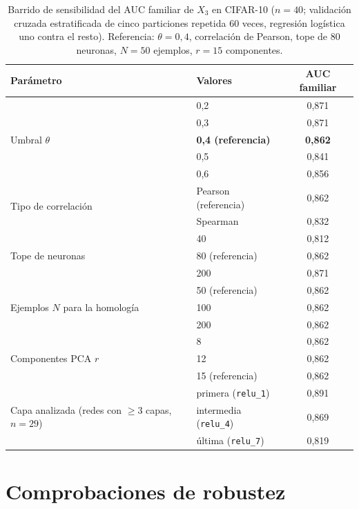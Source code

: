 \documentclass[11pt,a4paper]{article}
\theoremstyle{plain}
\theoremstyle{remark}
\begin{document}
\begin{table}[H]\centering\small
\caption{Barrido de sensibilidad del AUC familiar de $X_3$ en CIFAR-10 ($n{=}40$; validación cruzada estratificada de cinco particiones repetida 60 veces, regresión logística uno contra el resto). Referencia: $\theta{=}0{,}4$, correlación de Pearson, tope de 80 neuronas, $N{=}50$ ejemplos, $r{=}15$ componentes.}
\label{tab:barrido}
\begin{tabular}{l l c}\toprule
Parámetro & Valores & AUC familiar \\\midrule
\multirow{5}{*}{Umbral $\theta$} & 0,2 & 0,871 \\ & 0,3 & 0,871 \\ & \textbf{0,4 (referencia)} & \textbf{0,862} \\ & 0,5 & 0,841 \\ & 0,6 & 0,856 \\
\midrule
\multirow{2}{*}{Tipo de correlación} & Pearson (referencia) & 0,862 \\ & Spearman & 0,832 \\
\midrule
\multirow{3}{*}{Tope de neuronas} & 40 & 0,812 \\ & 80 (referencia) & 0,862 \\ & 200 & 0,871 \\
\midrule
\multirow{3}{*}{Ejemplos $N$ para la homología} & 50 (referencia) & 0,862 \\ & 100 & 0,862 \\ & 200 & 0,862 \\
\midrule
\multirow{3}{*}{Componentes PCA $r$} & 8 & 0,862 \\ & 12 & 0,862 \\ & 15 (referencia) & 0,862 \\
\midrule
\multirow{3}{*}{Capa analizada (redes con $\ge 3$ capas, $n{=}29$)} & primera (\texttt{relu\_1}) & 0,891 \\ & intermedia (\texttt{relu\_4}) & 0,869 \\ & última (\texttt{relu\_7}) & 0,819 \\
\bottomrule\end{tabular}\end{table}


\section{Comprobaciones de robustez}
\label{sec:robustez}
\end{document}

